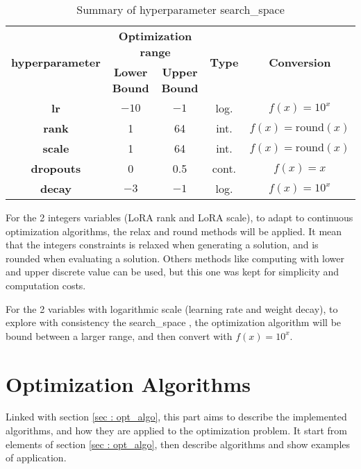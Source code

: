 \begin{table}[h]
    \centering
    \begin{tabular}{|c|c|c|c|c|}
        \hline
        \multirow{2}{*}{\textbf{ \Gls{hyperparameter} }} & \multicolumn{2}{|c|}{\textbf{Optimization range}} &\multirow{2}{*}{\textbf{ Type }}& \multirow{2}{*}{\textbf{ Conversion }} \\
        \cline{2-3}
         & \textbf{ Lower Bound } & \textbf{ Upper Bound } & & \\
        \hline
        \textbf{\Gls{lr}} & $-10$ & $-1$ & log. & $f(x) = 10^{x}$ \\
        \hline
        \textbf{\Gls{rank}} & 1 & 64 &int. &$f(x) = \text{round}(x)$ \\
        \hline
        \textbf{\Gls{scale}} &1 & 64 & int. &$f(x) = \text{round}(x)$ \\
        \hline
        \textbf{\Glspl{dropout}} & 0 & 0.5 & cont.& $f(x) = x$ \\
        \hline
        \textbf{\Gls{decay}} & $-3$ & $-1$ &log.& $f(x) = 10^{x}$  \\
        \hline
    \end{tabular}
    \caption{Summary of \gls{hyperparameter} \Gls{search_space} }
    \label{tab:hyperparam_table}
\end{table}

For the 2 integers variables (LoRA rank and LoRA scale), to adapt to continuous optimization algorithms, the relax and round methods will be applied. It mean that the integers constraints is relaxed when generating a solution, and is rounded when evaluating a solution. Others methods like computing with lower and upper discrete value can be used, but this one was kept for simplicity and computation costs.

For the 2 variables with logarithmic scale (learning rate and weight decay), to explore with consistency the \gls{search_space} , the optimization algorithm will be bound between a larger range, and then convert with $f(x)=10^{x}$.

\section{Optimization Algorithms}
\label{sec:opt}
Linked with section \ref{sec : opt_algo}, this part aims to describe the implemented algorithms, and how they are applied to the optimization problem. It start from elements of section \ref{sec : opt_algo}, then describe algorithms and show examples of application.

